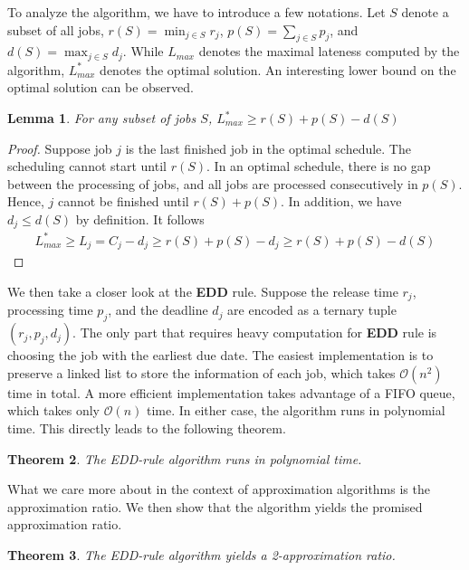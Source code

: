 \documentclass[11pt,psfig,times]{article}
\newcommand*{\bigo}[1]{\mathcal{O}(#1)}
\newtheorem{theorem}{Theorem}
\newtheorem{lemma}[theorem]{Lemma}
\begin{document}
To analyze the algorithm, we have to introduce a few notations. Let $S$ denote a subset of all jobs, $r(S) = \min_{j \in S} r_j$, $p(S) = \sum_{j \in S} p_j$, 
and $d(S) = \max_{j \in S} d_j$. While $L_{max}$ denotes the maximal lateness computed by the algorithm, $L_{max}^*$ denotes the optimal solution. 
An interesting lower bound on the optimal solution can be observed. 
\begin{lemma}
    \label{lemma:lowerbound}
    For any subset of jobs $S$, $L_{max}^* \geq r(S) + p(S) - d(S)$
\end{lemma}
\begin{proof}
    Suppose job $j$ is the last finished job in the optimal schedule. The scheduling cannot start until $r(S)$. In an optimal schedule, there is no gap between the processing of jobs, and all jobs 
    are processed consecutively in $p(S)$. Hence, $j$ cannot be finished until $r(S) + p(S)$. In addition, we have $d_j \leq d(S)$ by definition. It follows 
    \begin{align*}
        L_{max}^* \geq L_j = C_j - d_j \geq r(S) + p(S) - d_j \geq r(S) + p(S) - d(S)
    \end{align*} 
\end{proof}
We then take a closer look at the \textbf{EDD} rule. Suppose the release time $r_j$, processing time $p_j$, and the deadline $d_j$ are encoded as a ternary tuple $(r_j, p_j, d_j)$.
The only part that requires heavy computation for \textbf{EDD} rule is choosing the job with the earliest due date.
The easiest implementation is to preserve a linked list to store the information of each job, which takes $\bigo{n^2}$ time in total. 
A more efficient implementation takes advantage of a FIFO queue, which takes only $\bigo{n}$ time. In either case, 
the algorithm runs in polynomial time. This directly leads to the following theorem.
\begin{theorem}
    The EDD-rule algorithm runs in polynomial time. 
\end{theorem}
What we care more about in the context of approximation algorithms is the approximation ratio. We then show that the algorithm yields the promised approximation ratio.
\begin{theorem}
    The EDD-rule algorithm yields a 2-approximation ratio.
\end{theorem}
\end{document}
